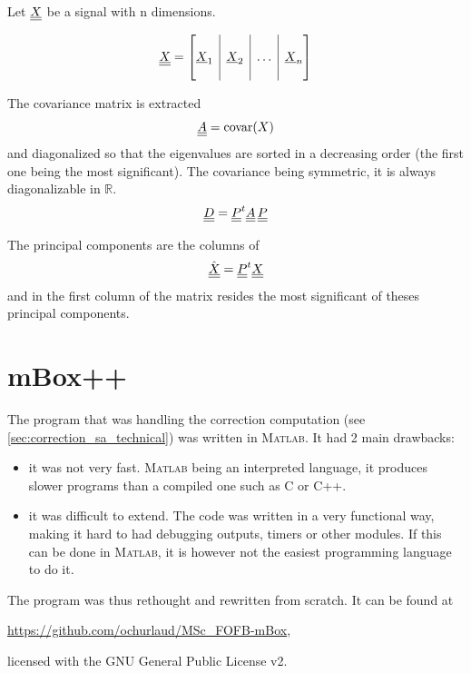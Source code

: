 Let $\underline{\underline{X}}$ be a signal with n dimensions.

\begin{equation}
\mat{X} = \left[
\begin{array}{@{}c|c|c|c@{}}
&&&\\ \vec{X}_1 & \vec{X}_2 & \dots & \vec{X}_n \\ &&&
\end{array}
\right]
\end{equation}

The covariance matrix is extracted
\begin{equation}
\underline{\underline{A}} = \text{covar}(X)
\end{equation}
and diagonalized so that the eigenvalues are sorted in a decreasing order (the first one being the most significant). The covariance being symmetric, it is always diagonalizable in $\mathbb{R}$.
\begin{equation}
\underline{\underline{D}} = \underline{\underline{P}}^{t} \underline{\underline{A}} \, \underline{\underline{P}}
\end{equation}

The principal components are the columns of
\begin{equation}
\hat{\underline{\underline{X}}} = \underline{\underline{P}}^{t} \underline{\underline{X}}
\end{equation}
and in the first column of the matrix resides the most significant of theses principal components.

\chapter{mBox++}
\label{apx:mbox}
The program that was handling the correction computation (see \cref{sec:correction_sa_technical}) was written in \textsc{Matlab}. It had 2 main drawbacks:
\begin{itemize}
    \item it was not very fast. \textsc{Matlab} being an interpreted language, it produces slower programs than a compiled one such as C or C++.
    \item it was difficult to extend. The code was written in a very functional way, making it hard to had debugging outputs, timers or other modules. If this can be done in \textsc{Matlab}, it is however not the easiest programming language to do it.
\end{itemize}

The program was thus rethought and rewritten from scratch. It can be found at
\begin{center}
    \url{https://github.com/ochurlaud/MSc_FOFB-mBox},
\end{center} 
licensed with the GNU General Public License v2.

